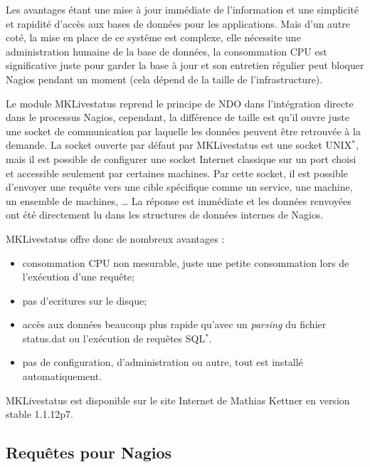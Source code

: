 Les avantages \'etant une mise \`a jour imm\'ediate de l'information et une simplicit\'e et rapidit\'e d'acc\`es aux bases de donn\'ees pour les applications.
Mais d'un autre cot\'e, la mise en place de ce syst\^eme est complexe, elle n\'ecessite une administration humaine de la base de donn\'ees, la consommation CPU est significative juste pour garder la base \`a jour et son entretien r\'egulier peut bloquer Nagios pendant un moment (cela d\'epend de la taille de l'infrastructure).

Le module MKLivestatus reprend le principe de NDO dans l'int\'egration directe dans le processus Nagios, cependant, la diff\'erence de taille est qu'il ouvre juste une socket de communication par laquelle les donn\'ees peuvent \^etre retrouv\'ee \`a la demande.
La socket ouverte par d\'efaut par MKLivestatus est une socket UNIX$^*$, mais il est possible de configurer une socket Internet classique sur un port choisi et accessible seulement par certaines machines.
Par cette socket, il est possible d'envoyer une requ\^ete vers une cible sp\'ecifique comme un service, une machine, un ensemble de machines, \ldots{}
La r\'eponse est imm\'ediate et les donn\'ees renvoy\'ees ont \'et\'e directement lu dans les structures de donn\'ees internes de Nagios.

\noindent MKLivestatus offre donc de nombreux avantages :

\begin{itemize}
	\item consommation CPU non mesurable, juste une petite consommation lors de l'ex\'ecution d'une requ\^ete;
	\item pas d'ecritures sur le disque;
	\item acc\`es aux donn\'ees beaucoup plus rapide qu'avec un \textit{parsing} du fichier \textsf{status.dat} ou l'ex\'ecution de requ\^etes SQL$^*$.
	\item pas de configuration, d'administration ou autre, tout est install\'e automatiquement.

\end{itemize}

\vspace{0.20cm}

MKLivestatus est disponible sur le site Internet\cite{biblio:siteMklivestatus} de Mathias Kettner en version stable 1.1.12p7.

\subsection{Requ\^etes pour Nagios}

